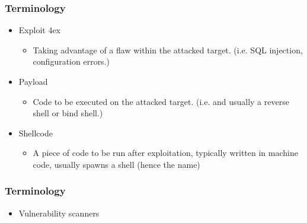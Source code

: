 \documentclass{beamer}
\begin{document}
\begin{frame}
	\frametitle{Terminology}
	\begin{itemize}
	\item<2-> Exploit \itemsep4ex
		\begin{itemize} 
		\item Taking advantage of a flaw within the attacked target. (i.e. SQL injection, configuration errors.)
		\end{itemize}
	\item<3-> Payload
		\begin{itemize} 
		\item Code to be executed on the attacked target. (i.e. and usually a reverse shell or bind shell.)
		\end{itemize}
	\item<4-> Shellcode
		\begin{itemize} 
		\item A piece of code to be run after exploitation, typically written in machine code, usually spawns a shell (hence the name)
		\end{itemize}
	\end{itemize}
\end{frame}

\begin{frame}
	\frametitle{Terminology}
	\begin{itemize}
	\item Vulnerability scanners
	\end{itemize}
\end{frame}
\end{document}
